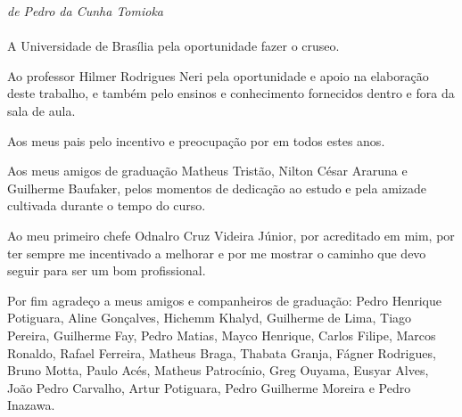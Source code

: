 \begin{agradecimentos}

\emph{de Pedro da Cunha Tomioka} \\ \\

A Universidade de Brasília pela oportunidade fazer o cruseo.

Ao professor Hilmer Rodrigues Neri pela oportunidade e apoio na elaboração deste trabalho, e também pelo ensinos e conhecimento fornecidos dentro e fora da sala de aula.

Aos meus pais pelo incentivo e preocupação por em todos estes anos.

Aos meus amigos de graduação Matheus Tristão, Nilton César Araruna e Guilherme Baufaker, pelos momentos de dedicação ao estudo e pela amizade cultivada durante o tempo do curso.

Ao meu primeiro chefe Odnalro Cruz Videira Júnior, por acreditado em mim, por ter sempre me incentivado a melhorar e por me mostrar o caminho que devo seguir para ser um bom profissional.

Por fim agradeço a meus amigos e companheiros de graduação: Pedro Henrique Potiguara, Aline Gonçalves, Hichemm Khalyd, Guilherme de Lima,  Tiago Pereira, Guilherme Fay, Pedro Matias, Mayco Henrique, Carlos Filipe, Marcos Ronaldo, Rafael Ferreira, Matheus Braga, Thabata Granja, Fágner Rodrigues, Bruno Motta, Paulo Acés, Matheus Patrocínio, Greg Ouyama, Eusyar Alves, João Pedro Carvalho, Artur Potiguara, Pedro Guilherme Moreira e Pedro Inazawa.


\end{agradecimentos}
